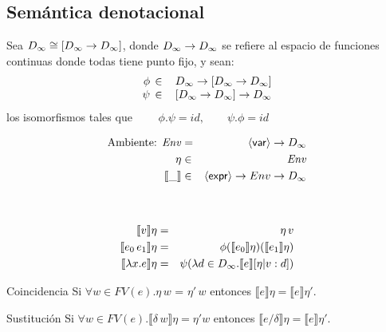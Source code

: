   \subsection{Semántica denotacional}
    \PN Sea $D_\infty \cong [D_\infty \to D_\infty]$, donde $D_\infty \rightarrow D_\infty$ se refiere al espacio de funciones continuas donde todas tiene punto fijo, y sean:
      \[
        \begin{array}{rl}
        \phi \,\in\, & D_\infty \to  [D_\infty \to  D_\infty]\\
        \psi \,\in\, & [D_\infty \to  D_\infty] \to  D_\infty
        \end{array}
      \]
      los isomorfismos tales que $\qquad \phi . \psi = id, \qquad \psi . \phi = id$

      \begin{multicols}{2}
        \begin{eqnarray*}
          \text{Ambiente: } \mathit{Env} &=& \langle \mathsf{var} \rangle \to D_\infty \\
          \eta &\in& \mathit{Env} \\
          \llbracket\_\rrbracket &\in& \langle \mathsf{expr} \rangle \to  Env \to  D_\infty \\ \\
        \end{eqnarray*}
        \begin{eqnarray*}
          \\
          \llbracket v\rrbracket\eta &=& \eta\, v \\
          \llbracket e_0\, e_1\rrbracket\eta &=& \phi(\llbracket e_0\rrbracket \eta) (\llbracket e_1\rrbracket\eta) \\
          \llbracket\lambda x.e\rrbracket\eta &=& \psi(\lambda d \in D_\infty. \llbracket e\rrbracket[\eta |v:d])
        \end{eqnarray*}        
      \end{multicols}
        
    \begin{theorem}{Coincidencia} Si $\forall w \in FV(e) . \eta\, w$ = $\eta'\, w$ entonces $\llbracket e\rrbracket \eta = \llbracket e\rrbracket \eta'$.
    \end{theorem}
        
    \begin{theorem}{Sustitución} Si $\forall w \in FV(e). \llbracket \delta\, w\rrbracket\eta = \eta' w$ entonces $\llbracket e/\delta\rrbracket \eta =\llbracket e\rrbracket\eta'$.
    \end{theorem}
    
